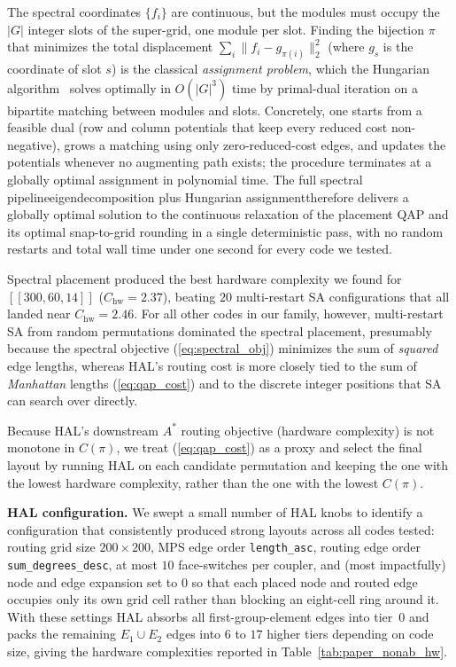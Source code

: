 The spectral coordinates $\{f_i\}$ are continuous, but the modules must occupy the $|G|$ integer slots of the super-grid, one module per slot. Finding the bijection $\pi$ that minimizes the total displacement $\sum_i \lVert f_i - g_{\pi(i)}\rVert_2^2$ (where $g_s$ is the coordinate of slot $s$) is the classical \emph{assignment problem}, which the Hungarian algorithm~\cite{hungarian} solves optimally in $O(|G|^3)$ time by primal-dual iteration on a bipartite matching between modules and slots. Concretely, one starts from a feasible dual (row and column potentials that keep every reduced cost non-negative), grows a matching using only zero-reduced-cost edges, and updates the potentials whenever no augmenting path exists; the procedure terminates at a globally optimal assignment in polynomial time. The full spectral pipeline\textemdash eigendecomposition plus Hungarian assignment\textemdash therefore delivers a globally optimal solution to the continuous relaxation of the placement QAP and its optimal snap-to-grid rounding in a single deterministic pass, with no random restarts and total wall time under one second for every code we tested.

Spectral placement produced the best hardware complexity we found for $[[300,60,14]]$ ($C_\mathrm{hw}=2.37$), beating $20$ multi-restart SA configurations that all landed near $C_\mathrm{hw}=2.46$. For all other codes in our family, however, multi-restart SA from random permutations dominated the spectral placement, presumably because the spectral objective (\ref{eq:spectral_obj}) minimizes the sum of \emph{squared} edge lengths, whereas HAL's routing cost is more closely tied to the sum of \emph{Manhattan} lengths (\ref{eq:qap_cost}) and to the discrete integer positions that SA can search over directly.

Because HAL's downstream $A^*$ routing objective (hardware complexity) is not monotone in $C(\pi)$, we treat (\ref{eq:qap_cost}) as a proxy and select the final layout by running HAL on each candidate permutation and keeping the one with the lowest hardware complexity, rather than the one with the lowest $C(\pi)$.

\smallskip
\noindent\textbf{HAL configuration.}
We swept a small number of HAL knobs to identify a configuration that consistently produced strong layouts across all codes tested: routing grid size $200 \times 200$, MPS edge order \texttt{length\_asc}, routing edge order \texttt{sum\_degrees\_desc}, at most $10$ face-switches per coupler, and (most impactfully) node and edge expansion set to $0$ so that each placed node and routed edge occupies only its own grid cell rather than blocking an eight-cell ring around it. With these settings HAL absorbs all first-group-element edges into tier~0 and packs the remaining $E_1 \cup E_2$ edges into $6$ to $17$ higher tiers depending on code size, giving the hardware complexities reported in Table~\ref{tab:paper_nonab_hw}.

